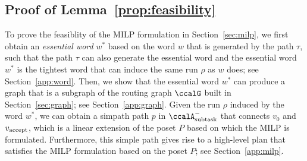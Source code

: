 \documentclass[Afour,sageh,times]{sagej}
\makeatletter
\newcommand{\auto}[1]{\ccalA_{\textup{#1}}}
\newcommand{\vertex}[1]{v_{\textup{#1}}}
\newcommand{\scriptveryshortarrow}[1][3pt]{{%
    \hbox{\rule[\scriptratio\dimexpr\fontdimen22\textfont2-.2pt\relax]
               {\scriptratio\dimexpr#1\relax}{\scriptratio\dimexpr.4pt\relax}}%
   \mkern-4mu\hbox{\let\f@size\sf@size\usefont{U}{lasy}{m}{n}\symbol{41}}}}
\makeatother
\begin{document}
{{%




\subsection{Proof of Lemma~\ref{prop:feasibility}}\label{app:feasibility}
To prove the feasiblity of the MILP formulation in Section~\ref{sec:milp}, we first obtain an {\it essential word} $w^*$ based on the word $w$ that is generated by the path $\tau$, such that the path $\tau$ can also generate the essential word and the essential word $w^*$ is the tightest word that can induce the same run $\rho$ as $w$ does; see Section~\ref{app:word}. Then, we show that the essential word $w^*$ can produce a graph that is a subgraph of the routing graph $\ccalG$ built in Section~\ref{sec:graph}; see Section~\ref{app:graph}. Given the run $\rho$ induced by the word $w^*$, we can obtain a simpath path $p$ in $\auto{subtask}^-$ that connects $v_0$ and $\vertex{accept}$, which is a linear extension of the poset $P$ based on which the MILP is formulated. Furthermore, this simple path gives rise to a high-level plan that satisfies the MILP formulation based on the poset $P$; see Section~\ref{app:milp}.

}}
\end{document}
